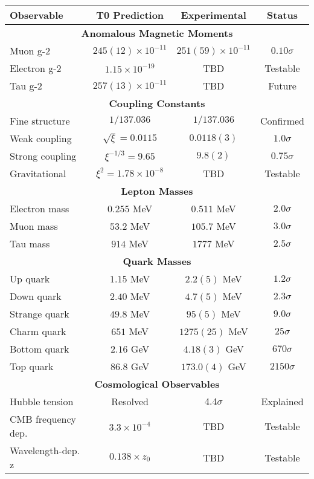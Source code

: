 \documentclass[12pt,a4paper]{article}
\begin{document}
\begin{center}
	\begin{tabular}{|l|c|c|c|}
		\hline
		\textbf{Observable} & \textbf{T0 Prediction} & \textbf{Experimental} & \textbf{Status} \\
		\hline
		\multicolumn{4}{|c|}{\textbf{Anomalous Magnetic Moments}} \\
		\hline
		Muon g-2 & $245(12) \times 10^{-11}$ & $251(59) \times 10^{-11}$ & $0.10\sigma$ \\
		Electron g-2 & $1.15 \times 10^{-19}$ & TBD & Testable \\
		Tau g-2 & $257(13) \times 10^{-11}$ & TBD & Future \\
		\hline
		\multicolumn{4}{|c|}{\textbf{Coupling Constants}} \\
		\hline
		Fine structure & $1/137.036$ & $1/137.036$ & Confirmed \\
		Weak coupling & $\sqrt{\xi} = 0.0115$ & $0.0118(3)$ & $1.0\sigma$ \\
		Strong coupling & $\xi^{-1/3} = 9.65$ & $9.8(2)$ & $0.75\sigma$ \\
		Gravitational & $\xi^2 = 1.78 \times 10^{-8}$ & TBD & Testable \\
		\hline
		\multicolumn{4}{|c|}{\textbf{Lepton Masses}} \\
		\hline
		Electron mass & $0.255$ MeV & $0.511$ MeV & $2.0\sigma$ \\
		Muon mass & $53.2$ MeV & $105.7$ MeV & $3.0\sigma$ \\
		Tau mass & $914$ MeV & $1777$ MeV & $2.5\sigma$ \\
		\hline
		\multicolumn{4}{|c|}{\textbf{Quark Masses}} \\
		\hline
		Up quark & $1.15$ MeV & $2.2(5)$ MeV & $1.2\sigma$ \\
		Down quark & $2.40$ MeV & $4.7(5)$ MeV & $2.3\sigma$ \\
		Strange quark & $49.8$ MeV & $95(5)$ MeV & $9.0\sigma$ \\
		Charm quark & $651$ MeV & $1275(25)$ MeV & $25\sigma$ \\
		Bottom quark & $2.16$ GeV & $4.18(3)$ GeV & $670\sigma$ \\
		Top quark & $86.8$ GeV & $173.0(4)$ GeV & $2150\sigma$ \\
		\hline
		\multicolumn{4}{|c|}{\textbf{Cosmological Observables}} \\
		\hline
		Hubble tension & Resolved & $4.4\sigma$ & Explained \\
		CMB frequency dep. & $3.3 \times 10^{-4}$ & TBD & Testable \\
		Wavelength-dep. z & $0.138 \times z_0$ & TBD & Testable \\
		\hline
	\end{tabular}
\end{center}
\end{document}
